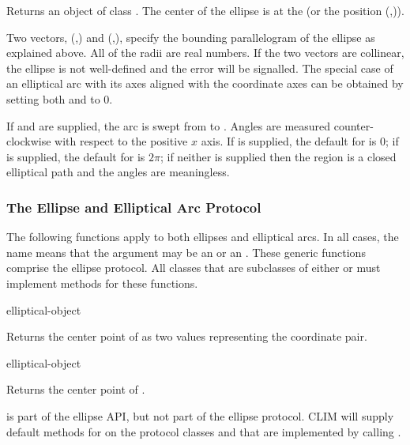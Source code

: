 Returns an object of class .  The center of the
ellipse is at the   (or the position
(,)).

Two vectors, (,) and
(,), specify the bounding parallelogram of the
ellipse as explained above.  All of the radii are real numbers.   If the two
vectors are collinear, the ellipse is not well-defined and the
 error will be signalled.  The special case of
an elliptical arc with its axes aligned with the coordinate axes can be obtained
by setting both  and  to 0.

If  and  are supplied, the arc is swept from
 to .  Angles are measured counter-clockwise
with respect to the positive $x$ axis.  If  is supplied, the
default for  is $0$; if  is supplied, the
default for  is $2\pi$; if neither is supplied then the region is
a closed elliptical path and the angles are meaningless.

\MayCaptureInputs


\subsubsection {The Ellipse and Elliptical Arc Protocol}

The following functions apply to both ellipses and elliptical arcs.  In all
cases, the name  means that the argument may be an
 or an .  These generic functions comprise
the ellipse protocol.  All classes that are subclasses of either  or
 must implement methods for these functions.

 {elliptical-object}

Returns the center point of  as two values representing
the coordinate pair.

 {elliptical-object}

Returns the center point of .  

 is part of the ellipse API, but not part of the ellipse
protocol.  CLIM will supply default methods for  on the
protocol classes  and  that are implemented by
calling .

